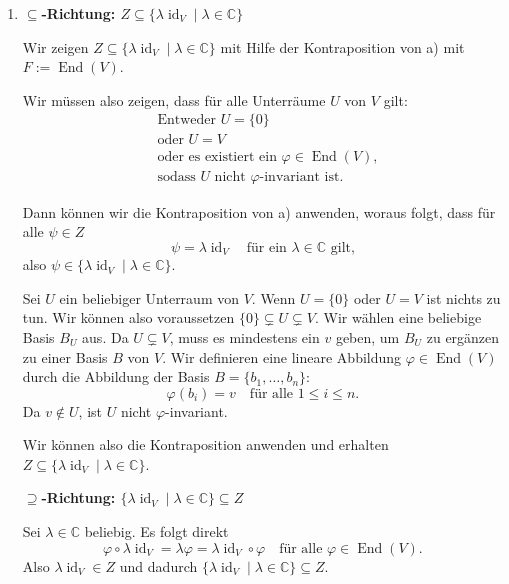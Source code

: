 \documentclass[a4paper,12pt]{article}
\begin{document}
\begin{enumerate}[label=\alph*)]
  Zusammengefasst gilt also
  $\{0\} \subsetneq \operatorname{Eig}_\psi(\lambda) \subsetneq V$ sowie
  $\operatorname{Eig}_\psi(\lambda)$ $\varphi$-invariant für alle
  $\varphi \in F$, was zu zeigen war.

  \item
  \textbf{$\subseteq$-Richtung: $Z \subseteq \{\lambda \operatorname{id}_V \mid \lambda \in \mathbb{C}\}$}

  Wir zeigen $Z \subseteq \{\lambda \operatorname{id}_V \mid \lambda \in \mathbb{C}\}$
  mit Hilfe der Kontraposition von a) mit $F := \operatorname{End}(V)$.

  Wir müssen also zeigen, dass für alle Unterräume $U$ von $V$ gilt:
  \begin{align*}
    &\text{Entweder } U = \{0\} \\
    &\text{oder } U = V \\
    &\text{oder es existiert ein } \varphi \in \operatorname{End}(V), \\
    &\text{sodass } U \text{ nicht } \varphi\text{-invariant ist.}
  \end{align*}

  Dann können wir die Kontraposition von a) anwenden, woraus folgt, dass für
  alle $\psi \in Z$
  \[
    \psi = \lambda \operatorname{id}_V \quad \text{für ein } \lambda \in \mathbb{C} \text{ gilt,}
  \]
  also $\psi \in \{\lambda \operatorname{id}_V \mid \lambda \in \mathbb{C}\}$.

  Sei $U$ ein beliebiger Unterraum von $V$. Wenn $U = \{0\}$ oder $U = V$ ist
  nichts zu tun. Wir können also voraussetzen $\{0\} \subsetneq U \subsetneq V$.
  Wir wählen eine beliebige Basis $B_U$ aus. Da $U \subsetneq V$, muss es
  mindestens ein $v$ geben, um $B_U$ zu ergänzen zu einer Basis $B$ von $V$.
  Wir definieren eine lineare Abbildung $\varphi \in \operatorname{End}(V)$
  durch die Abbildung der Basis $B = \{b_1, \ldots, b_n\}$:
  \[
    \varphi(b_i) = v \quad \text{für alle } 1 \leq i \leq n.
  \]
  Da $v \notin U$, ist $U$ nicht $\varphi$-invariant.

  Wir können also die Kontraposition anwenden und erhalten
  $Z \subseteq \{\lambda \operatorname{id}_V \mid \lambda \in \mathbb{C}\}$.

  \textbf{$\supseteq$-Richtung: $\{\lambda \operatorname{id}_V \mid \lambda \in \mathbb{C}\} \subseteq Z$}

  Sei $\lambda \in \mathbb{C}$ beliebig. Es folgt direkt
  \[
    \varphi \circ \lambda \operatorname{id}_V = \lambda \varphi
    = \lambda \operatorname{id}_V \circ \varphi
    \quad \text{für alle } \varphi \in \operatorname{End}(V).
  \]
  Also $\lambda \operatorname{id}_V \in Z$ und dadurch
  $\{\lambda \operatorname{id}_V \mid \lambda \in \mathbb{C}\} \subseteq Z$.
\end{enumerate}
\end{document}
